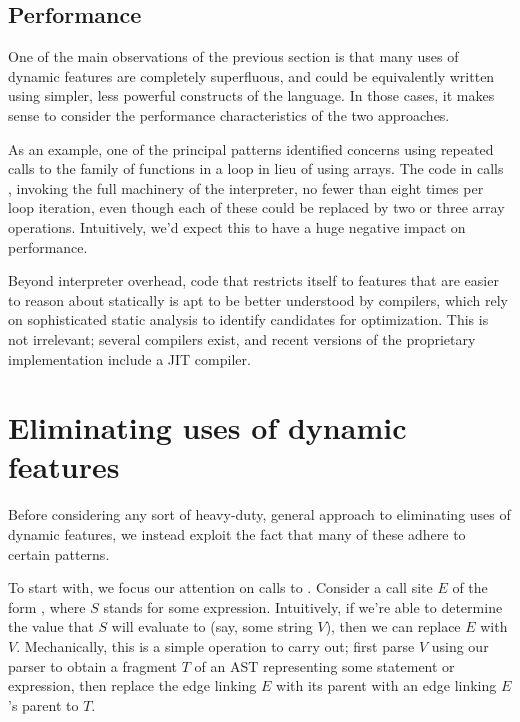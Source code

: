 \subsection{Performance}

One of the main observations of the previous section is that many uses of
dynamic features are completely superfluous, and could be equivalently written
using simpler, less powerful constructs of the language. In those cases, it
makes sense to consider the performance characteristics of the two approaches.

As an example, one of the principal patterns identified concerns using repeated
calls to the  family of functions in a loop in lieu of using arrays.
The code in  calls , invoking the full
machinery of the interpreter, no fewer than eight times per loop iteration,
even though each of these could be replaced by two or three array operations.
Intuitively, we'd expect this to have a huge negative impact on performance.

Beyond interpreter overhead, code that restricts itself to features that are
easier to reason about statically is apt to be better understood by compilers,
which rely on sophisticated static analysis to identify candidates for
optimization. This is not irrelevant; several \matlab compilers exist, and
recent versions of the proprietary \matlab implementation include a JIT
compiler. %


\section{Eliminating uses of dynamic features}

Before considering any sort of heavy-duty, general approach to eliminating
uses of dynamic features, we instead exploit the fact that many of these
adhere to certain patterns.

To start with, we focus our attention on calls to . Consider a call
site $E$ of the form , where $S$ stands for some \matlab
expression. Intuitively, if we're able to determine the value that $S$ will
evaluate to (say, some string $V$), then we can replace $E$ with $V$.
Mechanically, this is a simple operation to carry out; first parse $V$ using
our \matlab parser to obtain a fragment $T$ of an AST representing some
statement or expression, then replace the edge linking $E$ with its parent with
an edge linking $E$'s parent to $T$.

